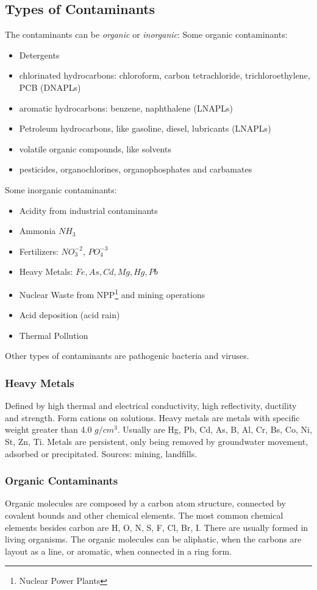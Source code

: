 \documentclass[11pt,twoside]{report}
\begin{document}
\subsection{Types of Contaminants}
The contaminants can be \textit{organic} or \textit{inorganic}:
Some organic contaminants:
\begin{itemize}
 \item Detergents
 \item chlorinated hydrocarbons: chloroform, carbon tetrachloride, trichloroethylene, PCB (DNAPLs)
 \item aromatic hydrocarbons: benzene, naphthalene (LNAPLs)
 \item Petroleum hydrocarbons, like gasoline, diesel, lubricants (LNAPLs)
 \item volatile organic compounds, like solvents
 \item pesticides, organochlorines, organophosphates and carbamates
\end{itemize}


Some inorganic contaminants:

\begin{itemize}
   \item Acidity from industrial contaminants
   \item Ammonia $NH_{3}$
   \item Fertilizers: $NO_{3}^{-2}$, $PO_{4}^{-3}$
   \item Heavy Metals: $Fe, As, Cd, Mg, Hg, Pb$
   \item Nuclear Waste from NPP\footnote{Nuclear Power Plants} and mining operations
   \item Acid deposition (acid rain)
   \item Thermal Pollution 
\end{itemize}

Other types of contaminants are pathogenic bacteria and viruses. 

\subsubsection{Heavy Metals}
Defined by high thermal and electrical conductivity, high reflectivity, ductility and strength. Form cations on solutions. Heavy metals are metals with specific weight greater than 4.0 $g/cm^{3}$. Usually are Hg, Pb, Cd, As, B, Al, Cr, Bs, Co, Ni, St, Zn, Ti. Metals are persistent, only being removed by groundwater movement, adsorbed or precipitated. Sources: mining, landfills. 

\subsubsection{Organic Contaminants}
Organic molecules are composed by a carbon atom structure, connected by covalent bounds and other chemical elements. The most common chemical elements besides carbon are H, O, N, S, F, Cl, Br, I. There are usually formed in living organisms. The organic molecules can be aliphatic, when the carbons are layout as a line, or aromatic, when connected in a ring form. 
\end{document}
